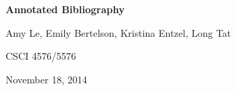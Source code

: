 \documentclass[12pt]{article}
\begin{document}
\begin{center}
   {\Large\textbf{Annotated Bibliography}}
\medskip

   {\large   Amy Le, Emily Bertelson, Kristina Entzel, Long Tat
\medskip

	CSCI 4576/5576
\medskip

           November 18, 2014
   }
\end{center}
\nocite{*}



\end{document}
